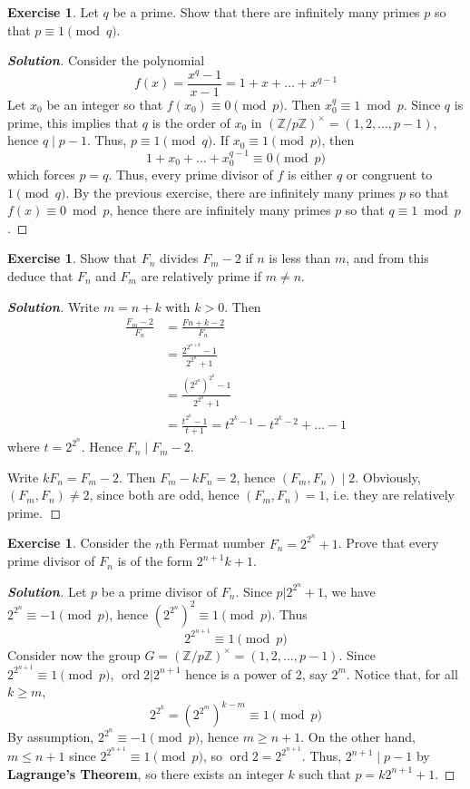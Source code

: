 \documentclass[12pt,leqno]{book}
\numberwithin{equation}{section}
\theoremstyle{definition}
\newtheorem{exer}[thm]{Exercise}
\newcommand{\ord}{\operatorname{ord}}
\newenvironment{Solution}{\begin{proof}[\textnormal{\textbf{Solution}}]}{\end{proof}}
\begin{document}
\begin{exer}
 Let $q$ be a prime. Show that there are infinitely many primes $p$ so that $p\equiv1\pmod{q}$.
\end{exer}

\begin{Solution}
 Consider the polynomial \[f(x)=\frac{x^q-1}{x-1}=1+x+\hdots+x^{q-1}\] Let $x_0$ be an integer so that $f(x_0)\equiv0\pmod{p}$. Then $x_0^q\equiv1\bmod{p}$. Since $q$ is prime, this implies that $q$ is the order of $x_0$ in $\left(\mathbb{Z}/p\mathbb{Z}\right)^{\times}=(1,2,\hdots,p-1)$, hence $q\mid p-1$. Thus, $p\equiv1\pmod{q}$. If $x_0\equiv1\pmod{p}$, then \[1+x_0+\hdots+x_0^{q-1}\equiv0\pmod{p}\] which forces $p=q$. Thus, every prime divisor of $f$ is either $q$ or congruent to $1\pmod{q}$.  By the previous exercise, there are infinitely many primes $p$ so that $f(x)\equiv0\bmod{p}$, hence there are infinitely many primes $p$ so that $q\equiv1\bmod{p}$. 
\end{Solution}

\begin{exer}
 Show that $F_n$ divides $F_m-2$ if $n$ is less than $m$, and from this deduce that $F_n$ and $F_m$ are relatively prime if $m\not=n$.
\end{exer}

\begin{Solution}
 Write $m=n+k$ with $k>0$. Then \begin{align*}\frac{F_m-2}{F_n}&=\frac{F{n+k}-2}{F_n}\\&=\frac{2^{2^{n+k}}-1}{2^{2^n}+1}\\&=\frac{(2^{2^n})^{2^k}-1}{2^{2^n}+1}\\&=\frac{t^{2^k}-1}{t+1}=t^{2^k-1}-t^{2^k-2}+\hdots-1\end{align*} where $t=2^{2^n}$. Hence $F_n\mid F_m-2$. 

Write $kF_n=F_m-2$. Then $F_m-kF_n=2$, hence $(F_m,F_n)\mid2$. Obviously, $(F_m,F_n)\not=2$, since both are odd, hence $(F_m,F_n)=1$, i.e. they are relatively prime.$\qedhere$  
\end{Solution}

\begin{exer}
 Consider the $n$th Fermat number $F_n=2^{2^n}+1$. Prove that every prime divisor of $F_n$ is of the form $2^{n+1}k+1$.
\end{exer}

\begin{Solution}
 Let $p$ be a prime divisor of $F_n$. Since $p|2^{2^n}+1$, we have $2^{2^n}\equiv-1\pmod{p}$, hence $(2^{2^n})^2\equiv1\pmod{p}$. Thus \[2^{2^{n+1}}\equiv1\pmod{p}\] Consider now the group $G=\left(\mathbb{Z}/p\mathbb{Z}\right)^{\times}=(1,2,\hdots,p-1)$. Since $2^{2^{n+1}}\equiv1\pmod{p}$, $\ord{2}|2^{n+1}$ hence is a power of 2, say $2^m$. Notice that, for all $k\geq m$, \[2^{2^k}=(2^{2^m})^{k-m}\equiv1\pmod{p}\] By assumption, $2^{2^n}\equiv-1\pmod{p}$, hence $m\geq n+1$. On the other hand, $m\leq n+1$ since $2^{2^{n+1}}\equiv1\pmod{p}$, so $\ord{2}=2^{2^{n+1}}$. Thus, $2^{n+1}\mid p-1$ by \textbf{Lagrange's Theorem}, so there exists an integer $k$ such that $p=k2^{n+1}+1$. 
\end{Solution}
\end{document}
